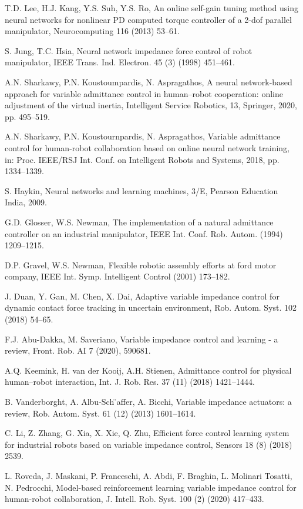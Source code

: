 \documentclass{Diploma}
\begin{document}
\begin{reflist}
  \item  T.D. Lee, H.J. Kang, Y.S. Suh, Y.S. Ro, An online self-gain tuning method using neural networks for nonlinear PD computed torque controller of a 2-dof parallel manipulator, Neurocomputing 116 (2013) 53–61. 
  \item  S. Jung, T.C. Hsia, Neural network impedance force control of robot manipulator, IEEE Trans. Ind. Electron. 45 (3) (1998) 451–461. \item  A.N. Sharkawy, P.N. Koustoumpardis, N. Aspragathos, A neural network-based approach for variable admittance control in human–robot cooperation: online adjustment of the virtual inertia, Intelligent Service Robotics, 13, Springer, 2020, pp. 495–519. 
  \item  A.N. Sharkawy, P.N. Koustournpardis, N. Aspragathos, Variable admittance control for human-robot collaboration based on online neural network training, in: Proc. IEEE/RSJ Int. Conf. on Intelligent Robots and Systems, 2018, pp. 1334–1339. 
  \item  S. Haykin, Neural networks and learning machines, 3/E, Pearson Education India, 2009. 
  \item  G.D. Glosser, W.S. Newman, The implementation of a natural admittance controller on an industrial manipulator, IEEE Int. Conf. Rob. Autom. (1994) 1209–1215. 
  \item  D.P. Gravel, W.S. Newman, Flexible robotic assembly efforts at ford motor company, IEEE Int. Symp. Intelligent Control (2001) 173–182. 
  \item  J. Duan, Y. Gan, M. Chen, X. Dai, Adaptive variable impedance control for dynamic contact force tracking in uncertain environment, Rob. Autom. Syst. 102 (2018) 54–65. 
  \item  F.J. Abu-Dakka, M. Saveriano, Variable impedance control and learning - a review, Front. Rob. AI 7 (2020), 590681. 
  \item  A.Q. Keemink, H. van der Kooij, A.H. Stienen, Admittance control for physical human–robot interaction, Int. J. Rob. Res. 37 (11) (2018) 1421–1444. 
  \item  B. Vanderborght, A. Albu-Sch ̈affer, A. Bicchi, Variable impedance actuators: a review, Rob. Autom. Syst. 61 (12) (2013) 1601–1614. 
  \item  C. Li, Z. Zhang, G. Xia, X. Xie, Q. Zhu, Efficient force control learning system for industrial robots based on variable impedance control, Sensors 18 (8) (2018) 2539. 
  \item  L. Roveda, J. Maskani, P. Franceschi, A. Abdi, F. Braghin, L. Molinari Tosatti, N. Pedrocchi, Model-based reinforcement learning variable impedance control for human-robot collaboration, J. Intell. Rob. Syst. 100 (2) (2020) 417–433.
\end{reflist}
\end{document}
